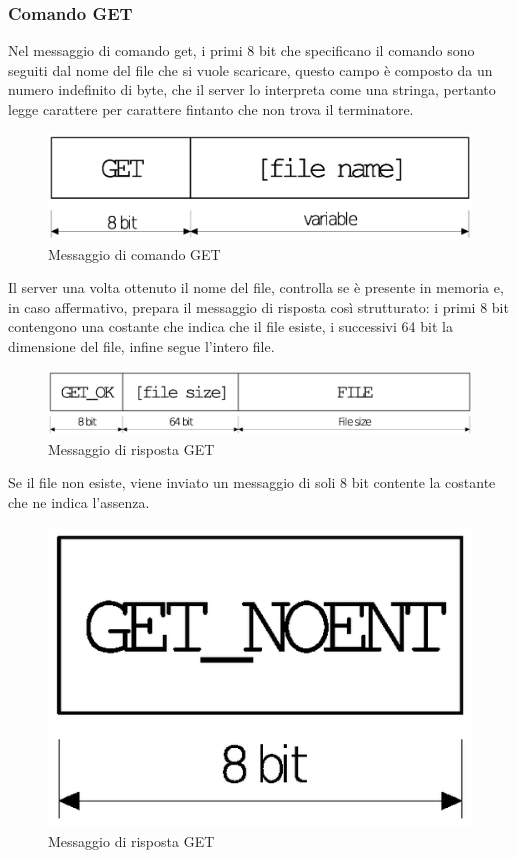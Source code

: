 \subsubsection{Comando GET}
Nel messaggio di comando get, i primi 8 bit che specificano il comando sono 
seguiti dal nome del file che si vuole scaricare, questo campo è composto da un 
numero indefinito di byte, che il server lo interpreta come una stringa, 
pertanto legge carattere per carattere fintanto che non trova il terminatore.
\begin{figure}[!h]
	\includegraphics[scale=0.35]{images/get_client}
	\caption{Messaggio di comando GET}
\end{figure}
Il server una volta ottenuto il nome del file, controlla se è presente in memoria e, in caso affermativo, prepara il messaggio di risposta così strutturato:
i primi 8 bit contengono una costante che indica che il file esiste, i successivi 64 bit la dimensione del file, infine segue l'intero file.
\begin{figure}[!h]
	\includegraphics[scale=0.35]{images/get_server_ok}
	\caption{Messaggio di risposta GET}
\end{figure}
Se il file non esiste, viene inviato un messaggio di soli 8 bit contente la costante che ne indica l'assenza.
\begin{figure}[!h]
	\includegraphics[scale=0.35]{images/get_server_noent}
	\caption{Messaggio di risposta GET}
\end{figure}
